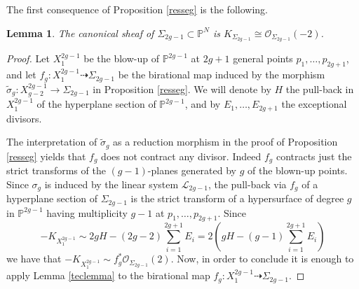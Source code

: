 \documentclass[a4paper,10pt]{amsart}
\newtheorem{Lemma}[thm]{Lemma}
\theoremstyle{definition}
\begin{document}
The first consequence of Proposition \ref{resseg} is the following.

\begin{Lemma}\label{can}
The canonical sheaf of $\Sigma_{2g-1}\subset\mathbb{P}^N$ is $K_{\Sigma_{2g-1}}\cong \mathcal{O}_{\Sigma_{2g-1}}(-2)$.
\end{Lemma}
\begin{proof}
Let $X^{2g-1}_1$ be the blow-up of $\mathbb{P}^{2g-1}$ at $2g+1$ general points $p_1,\dots,p_{2g+1}$, and let $f_g:X^{2g-1}_1\dasharrow \Sigma_{2g-1}$ be the birational map induced by the morphism $\widetilde{\sigma}_g:X^{2g-1}_{g-2}\rightarrow\Sigma_{2g-1}$ in Proposition \ref{resseg}. We will denote by $H$ the pull-back in $X_1^{2g-1}$ of the hyperplane section of $\mathbb{P}^{2g-1}$, and by $E_{1},\dots,E_{2g+1}$ the exceptional divisors.  

The interpretation of $\widetilde{\sigma}_g$ as a reduction morphism in the proof of Proposition \ref{resseg} yields that $f_g$ does not contract any divisor. Indeed $f_g$ contracts just the strict transforms of the $(g-1)$-planes generated by $g$ of the blown-up points. Since $\sigma_g$ is induced by the linear system $\mathcal{L}_{2g-1}$, the pull-back via $f_g$ of a hyperplane section of $\Sigma_{2g-1}$ is the strict transform of a hypersurface of degree $g$ in $\mathbb{P}^{2g-1}$ having multiplicity $g-1$ at $p_1,\dots,p_{2g+1}$. Since
$$-K_{X^{2g-1}_1}\sim 2gH-(2g-2)\sum_{i=1}^{2g+1}E_i = 2\left(gH-(g-1)\sum_{i=1}^{2g+1}E_i\right)$$ 
we have that $-K_{X^{2g-1}_1}\sim f_g^{*}\mathcal{O}_{\Sigma_{2g-1}}(2)$. Now, in order to conclude it is enough to apply Lemma \ref{teclemma} to the birational map $f_g:X^{2g-1}_1\dasharrow \Sigma_{2g-1}$.
\end{proof}
\end{document}
